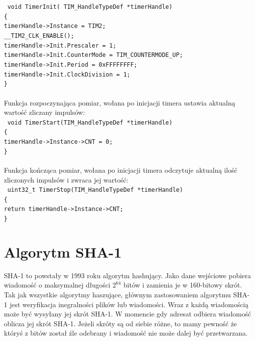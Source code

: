 \documentclass[oneside]{mgr}
\begin{document}
\texttt{
void TimerInit( TIM\_HandleTypeDef *timerHandle)\\
\{\\
\hspace*{10mm}timerHandle->Instance = TIM2;\\
\hspace*{10mm}\_\_TIM2\_CLK\_ENABLE();\\
\hspace*{10mm}timerHandle->Init.Prescaler = 1;\\
\hspace*{10mm}timerHandle->Init.CounterMode = TIM\_COUNTERMODE\_UP;\\
\hspace*{10mm}timerHandle->Init.Period = 0xFFFFFFFF;\\
\hspace*{10mm}timerHandle->Init.ClockDivision = 1;\\\}\\
}
\\Funkcja rozpoczynająca pomiar, wołana po inicjacji timera ustawia aktualną wartość zliczany impulsów:\\
\texttt{
void TimerStart(TIM\_HandleTypeDef *timerHandle)\\
\{\\
\hspace*{10mm}timerHandle->Instance->CNT = 0;\\
\}\\
}
\\Funkcja kończąca pomiar, wołana po inicjacji timera odczytuje aktualną ilość zliczonych impulsów i zwraca jej wartość:\\
\texttt{
uint32\_t TimerStop(TIM\_HandleTypeDef *timerHandle)\\
\{\\
\hspace*{10mm}return timerHandle->Instance->CNT;\\
\}
}

\chapter{Algorytm SHA-1}

SHA-1 to powstały w 1993 roku algorytm hashujący. Jako dane wejściowe pobiera wiadomość o maksymalnej długości $2^{64}$ bitów i zamienia je w 160-bitowy skrót. Tak jak wszystkie algorytmy haszujące, głównym zastosowaniem algorytmu SHA-1 jest weryfikacja inegralności plików lub wiadomości. Wraz z każdą wiadomością może być wysyłany jej skrót SHA-1. W momencie gdy adresat odbiera wiadomość oblicza jej skrót SHA-1. Jeżeli skróty są od siebie różne, to mamy pewność że któryś z bitów został źle odebrany i wiadomość nie może dalej być przetwarzana. 
\end{document}
